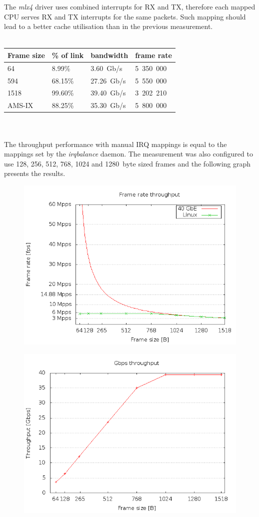 The {\it{mlx4}} driver uses combined interrupts for RX and TX,
therefore each mapped CPU serves RX and TX interrupts for the same packets.
Such mapping should lead to a better cache utilisation than in the previous measurement.
\\
\\
\begin{tabular}{ | l | l | l | l |}
\hline
Frame size & \% of link & bandwidth & frame rate \\
\hline
64     &  8.99\% &  3.60~Gb/s & 5~350~000 \\
594    & 68.15\% & 27.26~Gb/s & 5~550~000 \\
1518   & 99.60\% & 39.40~Gb/s & 3~202~210 \\
AMS-IX & 88.25\% & 35.30~Gb/s & 5~800~000 \\
\hline
\end{tabular}
\\
\\
The throughput performance with manual IRQ mappings is equal to the mappings set by the {\it{irqbalance}} daemon.
The measurement was also configured to use 128, 256, 512, 768, 1024 and 1280~byte sized frames
and the following graph presents the results.
\begin{figure}[H]
	\centering
	\includegraphics[width=12cm,keepaspectratio]{fig/frames.png}
\end{figure}
\begin{figure}[H]
	\centering
	\includegraphics[width=12cm,keepaspectratio]{fig/gigabits.png}
\end{figure}
